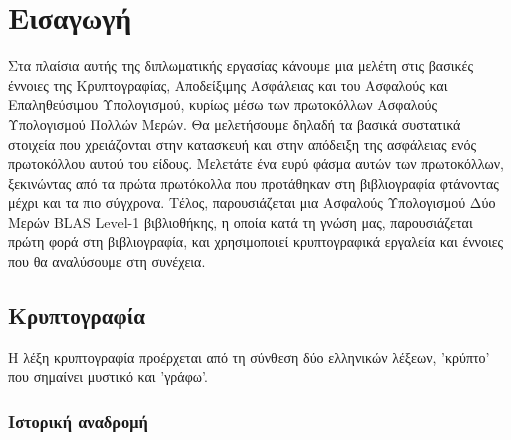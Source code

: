 %

\chapter{Εισαγωγή}

\label{chapter:intro}

Στα πλαίσια αυτής της διπλωματικής εργασίας κάνουμε μια μελέτη στις βασικές έννοιες της Κρυπτογραφίας, Αποδείξιμης Ασφάλειας και του Ασφαλούς και Επαληθεύσιμου Υπολογισμού, κυρίως μέσω των πρωτοκόλλων Ασφαλούς Υπολογισμού Πολλών Μερών. Θα μελετήσουμε δηλαδή τα βασικά συστατικά στοιχεία που χρειάζονται στην κατασκευή και στην απόδειξη της ασφάλειας ενός πρωτοκόλλου αυτού του είδους. Μελετάτε ένα ευρύ φάσμα αυτών των πρωτοκόλλων, ξεκινώντας από τα πρώτα πρωτόκολλα που προτάθηκαν στη βιβλιογραφία φτάνοντας μέχρι και τα πιο σύγχρονα. Τέλος, παρουσιάζεται μια Ασφαλούς Υπολογισμού Δύο Μερών BLAS Level-1 βιβλιοθήκης, η οποία κατά τη γνώση μας, παρουσιάζεται πρώτη φορά στη βιβλιογραφία, και χρησιμοποιεί κρυπτογραφικά εργαλεία και έννοιες που θα αναλύσουμε στη συνέχεια.


\section{Κρυπτογραφία}

Η λέξη κρυπτογραφία προέρχεται από τη σύνθεση δύο ελληνικών λέξεων, 'κρύπτο' που σημαίνει μυστικό και 'γράφω'.

\subsection{Ιστορική αναδρομή}

